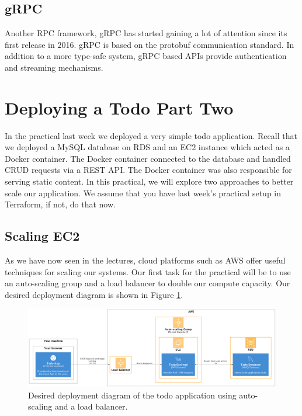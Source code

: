\documentclass{csse4400}
\begin{document}
\subsection{gRPC}
Another RPC framework, gRPC has started gaining a lot of attention since its first release in 2016.
gRPC is based on the protobuf communication standard.
In addition to a more type-safe system,
gRPC based APIs provide authentication and streaming mechanisms.

\section{Deploying a Todo Part Two}

In the practical last week we deployed a very simple todo application.
Recall that we deployed a MySQL database on RDS and an EC2 instance which acted as a Docker container.
The Docker container connected to the database and handled CRUD requests via a REST API.
The Docker container was also responsible for serving static content.
In this practical, we will explore two approaches to better scale our application.
We assume that you have last week's practical setup in Terraform, if not, do that now.


\subsection{Scaling EC2}
As we have now seen in the lectures,
cloud platforms such as AWS offer useful techniques for scaling our systems.
Our first task for the practical will be to use an auto-scaling group and a load balancer to double our compute capacity.
Our desired deployment diagram is shown in Figure \ref{fig:scale}.

\begin{figure}[ht]
\includegraphics[width=\textwidth]{diagrams/ScaleDeployment}
\caption{Desired deployment diagram of the todo application using auto-scaling and a load balancer.}
\label{fig:scale}
\end{figure}
\end{document}
